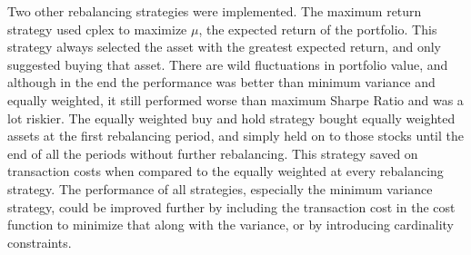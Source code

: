 \documentclass[english]{scrartcl}
\begin{document}
	Two other rebalancing strategies were implemented. The maximum return strategy used cplex to maximize $\mu$, the expected return of the portfolio. This strategy always selected the asset with the greatest expected return, and only suggested buying that asset. There are wild fluctuations in portfolio value, and although in the end the performance was better than minimum variance and equally weighted, it still performed worse than maximum Sharpe Ratio  and was a lot riskier. The equally weighted buy and hold strategy bought equally weighted assets at the first rebalancing period, and simply held on to those stocks until the end of all the periods without further rebalancing. This strategy saved on transaction costs when compared to the equally weighted at every rebalancing strategy. The performance of all strategies, especially the minimum variance strategy, could be improved further by including the transaction cost in the cost function to minimize that along with the variance, or by introducing cardinality constraints.
	
	
	
\end{document}
